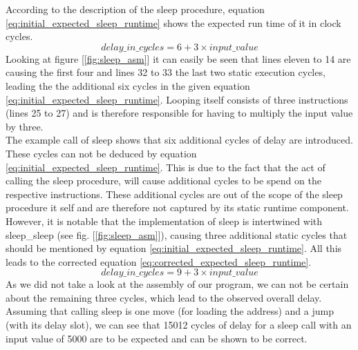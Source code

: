 			According to the description of the sleep procedure, equation \ref{eq:initial_expected_sleep_runtime} shows the expected run time of it in clock cycles. 
			\begin{equation} 
				\label{eq:initial_expected_sleep_runtime}
				delay\_in\_cycles = 6 + 3 \times input\_value
			\end{equation} 
			Looking at figure [\ref{fig:sleep_asm}] it can easily be seen that lines eleven to 14 are causing the first four and lines 32 to 33 the last two static execution cycles, leading the the additional six cycles in the given equation \ref{eq:initial_expected_sleep_runtime}. Looping itself consists of three instructions (lines 25 to 27) and is therefore responsible for having to multiply the input value by three.\\
			The example call of sleep shows that six additional cycles of delay are introduced. These cycles can not be deduced by equation \ref{eq:initial_expected_sleep_runtime}. This is due to the fact that the act of calling the sleep procedure, will cause additional cycles to be spend on the respective instructions. These additional cycles are out of the scope of the sleep procedure it self and are therefore not captured by its static runtime component. However, it is notable that the implementation of sleep is intertwined with sleep\_sleep (see fig. [\ref{fig:sleep_asm}]), causing three additional static cycles that should be mentioned by equation \ref{eq:initial_expected_sleep_runtime}. All this leads to the corrected equation \ref{eq:corrected_expected_sleep_runtime}.
			\begin{equation} 
				\label{eq:corrected_expected_sleep_runtime}
				delay\_in\_cycles = 9 + 3 \times input\_value
			\end{equation} 
			As we did not take a look at the assembly of our program, we can not be certain about the remaining three cycles, which lead to the observed overall delay. Assuming that calling sleep is one move (for loading the address) and a jump (with its delay slot), we can see that 15012 cycles of delay for a sleep call with an input value of 5000 are to be expected and can be shown to be correct.


